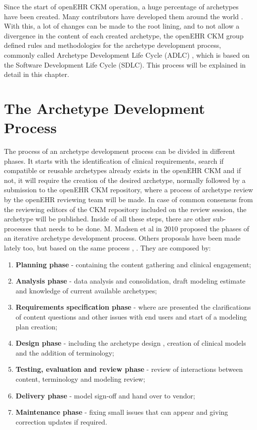 \documentclass[mim_thesis.tex]{subfiles}
\begin{document}
Since the start of openEHR CKM operation, a huge percentage of archetypes have been created. Many contributors have developed them around the world \citep{openEHRCKM}. With this, a lot of changes can be made to the root lining, and to not allow a divergence in the content of each created archetype, the openEHR CKM group defined rules and methodologies for the archetype development process, commonly called Archetype Development Life Cycle (ADLC) \citep{Madsen2010}, which is based on the Software Development Life Cycle (SDLC). This process will be explained in detail in this chapter.


\section{The Archetype Development Process}
The process of an archetype development process can be divided in different phases. It starts with the identification of clinical requirements, search if compatible or reusable archetypes already exists in the openEHR CKM and if not, it will require the creation of the desired archetype, normally followed by a submission to the openEHR CKM repository, where a process of archetype review by the openEHR reviewing team will be made. In case of common consensus from the reviewing editors of the CKM repository included on the review session, the archetype will be published. Inside of all these steps, there are other sub-processes that needs to be done. M. Madsen et al in 2010 proposed the phases of an iterative archetype development process. Others proposals have been made lately too, but based on the same process \citep{hammond2014standards}, \citep{Min2018ChinaEHR}. They are composed by:

\begin{enumerate}[noitemsep]
\item \textbf{Planning phase} - containing the content gathering and clinical engagement;
\item \textbf{Analysis phase} - data analysis and consolidation, draft modeling estimate and knowledge of current available archetypes;
\item \textbf{Requirements specification phase} - where are presented the clarifications of content questions and other issues with end users and start of a modeling plan creation;
\item \textbf{Design phase} - including the archetype design \citep{beale2007archetype}, creation of clinical models and the addition of terminology;
\item \textbf{Testing, evaluation and review phase} - review of interactions between content, terminology and modeling review;
\item \textbf{Delivery phase} - model sign-off and hand over to vendor;
\item \textbf{Maintenance phase} - fixing small issues that can appear and giving correction updates if required.
\end{enumerate}
\end{document}

